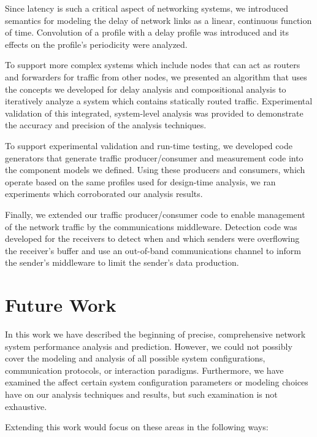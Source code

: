 Since latency is such a critical aspect of networking systems, we
introduced semantics for modeling the delay of network links as a
linear, continuous function of time.  Convolution of a profile with a
delay profile was introduced and its effects on the profile's
periodicity were analyzed.

To support more complex systems which include nodes that can act as
routers and forwarders for traffic from other nodes, we presented an
algorithm that uses the concepts we developed for delay analysis and
compositional analysis to iteratively analyze a system which contains
statically routed traffic.  Experimental validation of this
integrated, system-level analysis was provided to demonstrate the
accuracy and precision of the analysis techniques.  

To support experimental validation and run-time testing, we developed
code generators that generate traffic producer/consumer and
measurement code into the component models we defined.  Using these
producers and consumers, which operate based on the same profiles used
for design-time analysis, we ran experiments which corroborated our
analysis results.

Finally, we extended our traffic producer/consumer code to enable
management of the network traffic by the communications middleware.
Detection code was developed for the receivers to detect when and
which senders were overflowing the receiver's buffer and use an
out-of-band communications channel to inform the sender's middleware
to limit the sender's data production.  

\section{Future Work}
\label{sec:future_work}
In this work we have described the beginning of precise, comprehensive
network system performance analysis and prediction.  However, we could
not possibly cover the modeling and analysis of all possible system
configurations, communication protocols, or interaction paradigms.
Furthermore, we have examined the affect certain system configuration
parameters or modeling choices have on our analysis techniques and
results, but such examination is not exhaustive.

Extending this work would focus on these areas in the following ways:


